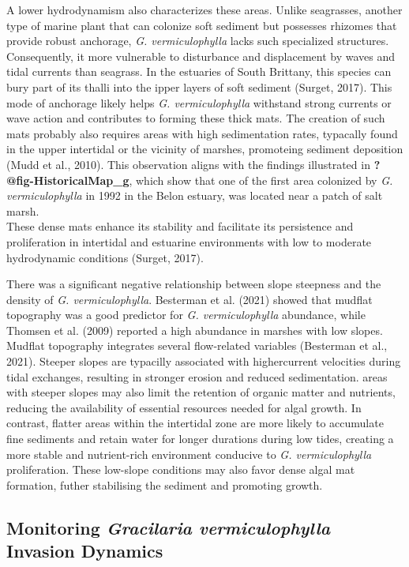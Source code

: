 \documentclass[
  letterpaper,
  11pt,
  english,
  singlespacing,
  headsepline]{MastersDoctoralThesis}
\begin{document}
\begin{spacing}{1.5}
A lower hydrodynamism also characterizes these areas. Unlike seagrasses,
another type of marine plant that can colonize soft sediment but
possesses rhizomes that provide robust anchorage, \emph{G.
vermiculophylla} lacks such specialized structures. Consequently, it
more vulnerable to disturbance and displacement by waves and tidal
currents than seagrass. In the estuaries of South Brittany, this species
can bury part of its thalli into the ipper layers of soft sediment
(Surget, 2017). This mode of anchorage likely helps \emph{G.
vermiculophylla} withstand strong currents or wave action and
contributes to forming these thick mats. The creation of such mats
probably also requires areas with high sedimentation rates, typacally
found in the upper intertidal or the vicinity of marshes, promoteing
sediment deposition (Mudd et al., 2010). This observation aligns with
the findings illustrated in \textbf{?@fig-HistoricalMap\_g}, which show
that one of the first area colonized by \emph{G. vermiculophylla} in
1992 in the Belon estuary, was located near a patch of salt marsh.\\
These dense mats enhance its stability and facilitate its persistence
and proliferation in intertidal and estuarine environments with low to
moderate hydrodynamic conditions (Surget, 2017).

There was a significant negative relationship between slope steepness
and the density of \emph{G. vermiculophylla}. Besterman et al. (2021)
showed that mudflat topography was a good predictor for \emph{G.
vermiculophylla} abundance, while Thomsen et al. (2009) reported a high
abundance in marshes with low slopes. Mudflat topography integrates
several flow-related variables (Besterman et al., 2021). Steeper slopes
are typacilly associated with highercurrent velocities during tidal
exchanges, resulting in stronger erosion and reduced sedimentation.
areas with steeper slopes may also limit the retention of organic matter
and nutrients, reducing the availability of essential resources needed
for algal growth. In contrast, flatter areas within the intertidal zone
are more likely to accumulate fine sediments and retain water for longer
durations during low tides, creating a more stable and nutrient-rich
environment conducive to \emph{G. vermiculophylla} proliferation. These
low-slope conditions may also favor dense algal mat formation, futher
stabilising the sediment and promoting growth.

\subsection{\texorpdfstring{Monitoring \emph{Gracilaria vermiculophylla}
Invasion
Dynamics}{Monitoring Gracilaria vermiculophylla Invasion Dynamics}}\label{monitoring-gracilaria-vermiculophylla-invasion-dynamics}


\end{spacing}
\end{document}
